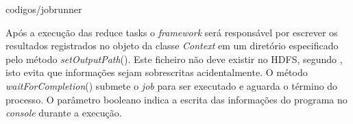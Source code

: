 
		{codigos/jobrunner}

Após a execução das reduce tasks o \textit{framework} será responsável por escrever os resultados registrados no objeto da classe \textit{Context} em um diretório  especificado pelo método \textit{setOutputPath}(). Este ficheiro não deve existir no HDFS, segundo , isto evita que informações sejam sobrescritas acidentalmente. O método \textit{waitForCompletion}() submete o \textit{job} para ser executado e aguarda o término do processo. O parâmetro booleano indica a escrita das informações do programa no \textit{console} durante a execução.


